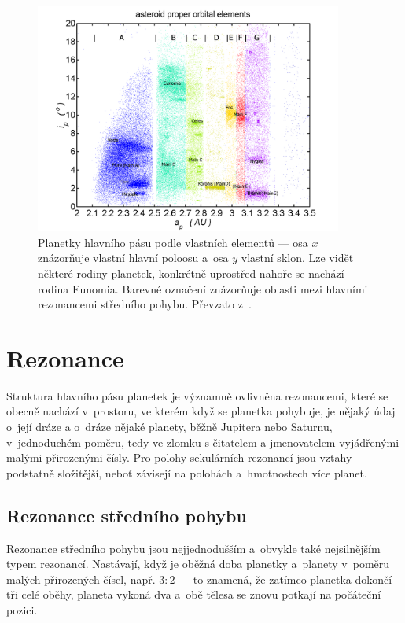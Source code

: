 \documentclass[A4paper, 12pt, oneside]{book}
\begin{document}
\begin{figure}
	\centering
	\includegraphics[width=0.9\textwidth]{obr/mainbelt.png}
	\caption{Planetky hlavního pásu podle vlastních elementů --- osa $x$ znázorňuje vlastní hlavní poloosu a~osa $y$ vlastní sklon. Lze vidět některé rodiny planetek, konkrétně uprostřed nahoře se nachází rodina Eunomia. Barevné označení znázorňuje oblasti mezi hlavními rezonancemi středního pohybu. Převzato z~\cite{wiki:belt}.} \label{fig:belt}
\end{figure}

\pagebreak
\section{Rezonance}
Struktura hlavního pásu planetek je významně ovlivněna rezonancemi, které se obecně nachází v~prostoru, ve kterém když se planetka pohybuje, je nějaký údaj o~její dráze a o~dráze nějaké planety, běžně Jupitera nebo Saturnu, v~jednoduchém poměru, tedy ve zlomku s čitatelem a jmenovatelem vyjádřenými malými přirozenými čísly. Pro polohy sekulárních rezonancí jsou vztahy podstatně složitější, neboť závisejí na polohách a~hmotnostech více planet.
\subsection{Rezonance středního pohybu} \label{sec:meanmotion}

Rezonance středního pohybu jsou nejjednodušším a~obvykle také nejsilnějším typem rezonancí. Nastávají, když je oběžná doba planetky a~planety v~poměru malých přirozených čísel, např. $3:2$ --- to znamená, že zatímco planetka dokončí tři celé oběhy, planeta vykoná dva a~obě tělesa se znovu potkají na počáteční pozici. 
\end{document}

